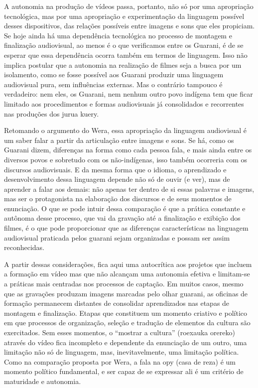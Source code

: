 \documentclass{article}
\begin{document}
A autonomia na produ\c{c}\~ao de v\'ideos passa, portanto, n\~ao s\'o
por uma apropria\c{c}\~ao tecnol\'ogica, mas por uma apropria\c{c}\~ao
e experimenta\c{c}\~ao da linguagem poss\'ivel desses dispositivos, das
rela\c{c}\~oes poss\'iveis entre imagens e sons que eles propiciam. Se
hoje ainda h\'a uma depend\^encia tecnol\'ogica no processo de montagem
e finaliza\c{c}\~ao audiovisual, ao menos \'e o que verificamos entre
os Guarani, \'e de se esperar que essa depend\^encia ocorra tamb\'em em
termos de linguagem. Isso n\~ao implica postular que a autonomia na
realiza\c{c}\~ao de filmes seja a busca por um isolamento, como se
fosse poss\'ivel aos Guarani produzir uma linguagem audiovisual pura,
sem influ\^encias externas. Mas o contr\'ario tampouco \'e verdadeiro:
nem eles, os Guarani, nem nenhum outro povo ind\'igena tem que ficar
limitado aos procedimentos e formas audiovisuais j\'a consolidados e
recorrentes nas produ\c{c}\~oes dos jurua kuery.

Retomando o argumento do Wera, essa apropria\c{c}\~ao da linguagem
audiovisual \'e um {\textquotedbl}saber falar{\textquotedbl} a partir
da articula\c{c}\~ao entre imagens e sons. Se h\'a, como os Guarani
dizem, diferen\c{c}as na forma como cada pessoa fala, e mais ainda
entre os diversos povos e sobretudo com os n\~ao-ind\'igenas, isso
tamb\'em ocorreria com os discursos audiovisuais. E da mesma forma que
o idioma, o aprendizado e desenvolvimento dessa linguagem depende n\~ao
s\'o de ouvir (e ver), mas de aprender a falar aos demais: n\~ao apenas
ter dentro de si essas palavras e imagens, mas ser o protagonista na
elabora\c{c}\~ao dos discursos e de seus momentos de enuncia\c{c}\~ao.
O que se pode intuir dessa compara\c{c}\~ao \'e que a pr\'atica
constante e aut\^onoma desse processo, que vai da grava\c{c}\~ao at\'e
a finaliza\c{c}\~ao e exibi\c{c}\~ao dos filmes, \'e o que pode
proporcionar que as diferen\c{c}as caracter\'isticas na linguagem
audiovisual praticada pelos guarani sejam organizadas e possam ser
assim reconhecidas. 

A partir dessas considera\c{c}\~oes, fica aqui uma autocr\'itica aos
projetos que incluem a forma\c{c}\~ao em v\'ideo mas que n\~ao
alcan\c{c}am uma autonomia efetiva e limitam-se a pr\'aticas mais
centradas nos processos de capta\c{c}\~ao. Em muitos casos, mesmo que
as grava\c{c}\~oes produzam imagens marcadas pelo olhar guarani, as
oficinas de forma\c{c}\~ao permanecem distantes de consolidar
aprendizados nas etapas de montagem e finaliza\c{c}\~ao. Etapas que
constituem um momento criativo e pol\'itico em que processos de
organiza\c{c}\~ao, sele\c{c}\~ao e tradu\c{c}\~ao de elementos da
cultura s\~ao exercitados. Sem esses momentos, o
{\textquotedblleft}mostrar a cultura{\textquotedblright} (roexauka
orereko) atrav\'es do v\'ideo fica incompleto e dependente da
enuncia\c{c}\~ao de um outro, uma limita\c{c}\~ao n\~ao s\'o de
linguagem, mas, inevitavelmente, uma limita\c{c}\~ao pol\'itica. Como
na compara\c{c}\~ao proposta por Wera, a fala na opy (casa de reza) \'e
um momento pol\'itico fundamental, e ser capaz de se expressar ali \'e
um crit\'erio de maturidade e autonomia.
\end{document}
